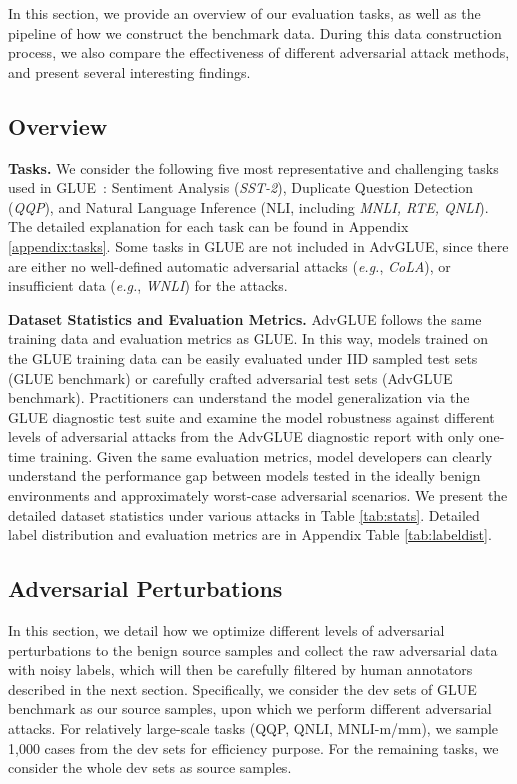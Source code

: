 \documentclass{article}
\newcommand{\method}{AdvGLUE\xspace}
\begin{document}
In this section, we provide an overview of our evaluation tasks, as well as the pipeline of how we construct the benchmark data.
During this data construction process, we also compare the effectiveness of different adversarial attack methods, and present several interesting findings.

\subsection{Overview}

\textbf{Tasks.} We consider the following five most representative and challenging tasks used in GLUE~\citep{wang2018glue}:  Sentiment Analysis (\textit{SST-2}),  
Duplicate Question Detection (\textit{QQP}), and 
Natural Language Inference (NLI, including \textit{MNLI, RTE, QNLI}).
The detailed explanation for each task can be found in Appendix \ref{appendix:tasks}. Some tasks in GLUE are not included in  \method, since
there are either no well-defined automatic adversarial attacks (\emph{e.g.}, \textit{CoLA}), or insufficient data  (\emph{e.g.}, \textit{WNLI}) for the attacks.

\textbf{Dataset Statistics and Evaluation Metrics.} 
\method follows the same training data and evaluation metrics as GLUE. In this way, models trained on the GLUE training data can be easily evaluated under IID sampled test sets (GLUE benchmark) or carefully crafted adversarial test sets (\method benchmark). Practitioners can understand the model generalization via the GLUE diagnostic test suite and examine the model robustness against different levels of adversarial attacks from the \method diagnostic report  with only one-time training.
Given the same evaluation metrics, model developers can clearly understand the performance gap between models tested in the ideally benign environments and  approximately worst-case adversarial scenarios.
We present the detailed dataset statistics under various attacks in Table \ref{tab:stats}. Detailed label distribution and evaluation metrics are  in Appendix Table \ref{tab:labeldist}.






\subsection{Adversarial Perturbations}
In this section, we detail how we optimize different levels of  adversarial perturbations to the benign source samples and collect the raw adversarial data with noisy labels, which will then be carefully filtered by human annotators described in the next section.
Specifically, we consider the dev sets of GLUE benchmark as our source samples, upon which we perform different adversarial attacks. For relatively large-scale tasks (QQP, QNLI, MNLI-m/mm), we sample 1,000 cases from the dev sets for efficiency purpose.
For the remaining tasks, we consider the whole dev sets as source samples.
\end{document}
